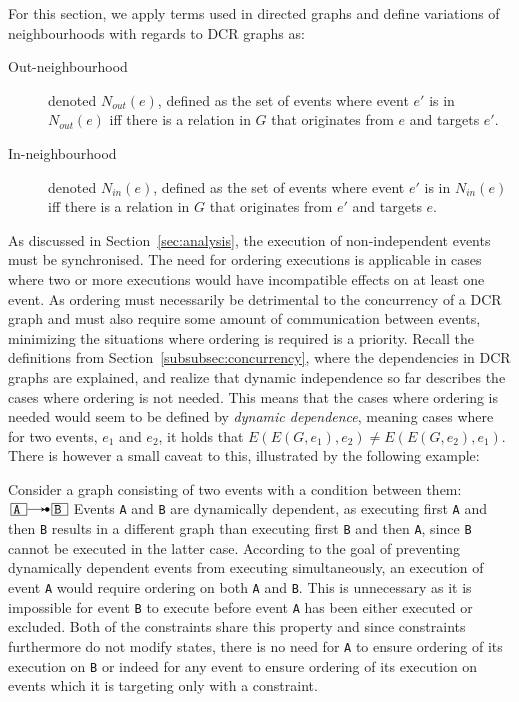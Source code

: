 \documentclass{article}
\begin{document}
	For this section, we apply terms used in directed graphs and define variations of neighbourhoods with regards to DCR graphs as:
	\begin{description}
		\item[Out-neighbourhood] denoted $N_{out}(e)$, defined as the set of events where event $e'$ is in $N_{out}(e)$ iff there is a relation in $G$ that originates from $e$ and targets $e'$.
		\item[In-neighbourhood] denoted $N_{in}(e)$, defined as the set of events where event $e'$ is in $N_{in}(e)$ iff there is a relation in $G$ that originates from $e'$ and targets $e$.
	\end{description}

	As discussed in Section~\ref{sec:analysis}, the execution of non-independent events must be synchronised.
	The need for ordering executions is applicable in cases where two or more executions would have incompatible effects on at least one event.
	As ordering must necessarily be detrimental to the concurrency of a DCR graph and must also require some amount of communication between events, minimizing the situations where ordering is required is a priority.
	Recall the definitions from Section~\ref{subsubsec:concurrency}, where the dependencies in DCR graphs are explained, and realize that dynamic independence so far describes the cases where ordering is not needed.
	This means that the cases where ordering is needed would seem to be defined by \textit{dynamic dependence}, meaning cases where for two events, $e_1$ and $e_2$, it holds that $E(E(G, e_1),e_2) \neq E(E(G, e_2),e_1)$.
	There is however a small caveat to this, illustrated by the following example:

	Consider a graph consisting of two events with a condition between them: $\ev{A} \crel \ev{B}$
	Events \texttt{A} and \texttt{B} are dynamically dependent, as executing first \texttt{A} and then \texttt{B} results in a different graph than executing first \texttt{B} and then \texttt{A}, since \texttt{B} cannot be executed in the latter case.
	According to the goal of preventing dynamically dependent events from executing simultaneously, an execution of event \texttt{A} would require ordering on both \texttt{A} and \texttt{B}.
	This is unnecessary as it is impossible for event \texttt{B} to execute before event \texttt{A} has been either executed or excluded.
	Both of the constraints share this property and since constraints furthermore do not modify states, there is no need for \texttt{A} to ensure ordering of its execution on \texttt{B} or indeed for any event to ensure ordering of its execution on events which it is targeting only with a constraint.
\end{document}
